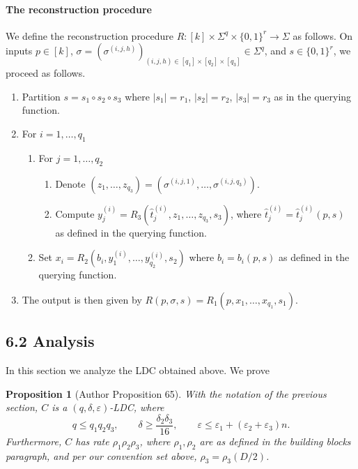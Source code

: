 \documentclass[10pt,a4paper]{article}
\newtheorem{ntproposition}[nttheorem]{Proposition}
\begin{document}
\paragraph{The reconstruction procedure}
We define the reconstruction procedure $R:[k]\times\Sigma^q\times\{0,1\}^r\to\Sigma$ as follows. On inputs $p\in[k]$, $\sigma=(\sigma^{(i,j,h)})_{(i,j,h)\in[q_1]\times[q_2]\times[q_3]}\in\Sigma^q$, and $s\in\{0,1\}^r$, we proceed as follows.
\begin{enumerate}
\item Partition $s=s_1\circ s_2\circ s_3$ where $|s_1|=r_1$, $|s_2|=r_2$, $|s_3|=r_3$ as in the querying function.
\item For $i=1,\ldots,q_1$
\begin{enumerate}
\item For $j=1,\ldots,q_2$
\begin{enumerate}
\item Denote $(z_1,\ldots,z_{q_3})=(\sigma^{(i,j,1)},\ldots,\sigma^{(i,j,q_3)})$.
\item Compute $y_j^{(i)}=R_3(\widehat t_j^{(i)},z_1,\ldots,z_{q_3},s_3)$, where $\widehat t_j^{(i)}=\widehat t_j^{(i)}(p,s)$ as defined in the querying function.
\end{enumerate}
\item Set $x_i=R_2(b_i,y_1^{(i)},\ldots,y_{q_2}^{(i)},s_2)$ where $b_i=b_i(p,s)$ as defined in the querying function.
\end{enumerate}
\item The output is then given by $R(p,\sigma,s)=R_1(p,x_1,\ldots,x_{q_1},s_1)$.
\end{enumerate}

\subsection*{6.2 Analysis}
In this section we analyze the LDC obtained above. We prove
\setcounter{nttheorem}{64}
\begin{ntproposition}[Author Proposition 65]
With the notation of the previous section, $C$ is a $(q,\delta,\varepsilon)$-LDC, where
\[q\leq q_1q_2q_3,\qquad\delta\geq\frac{\delta_2\delta_3}{16},\qquad\varepsilon\leq\varepsilon_1+(\varepsilon_2+\varepsilon_3)n.\]
Furthermore, $C$ has rate $\rho_1\rho_2\rho_3$, where $\rho_1,\rho_2$ are as defined in the building blocks paragraph, and per our convention set above, $\rho_3=\rho_3(D/2)$.
\end{ntproposition}
\end{document}
